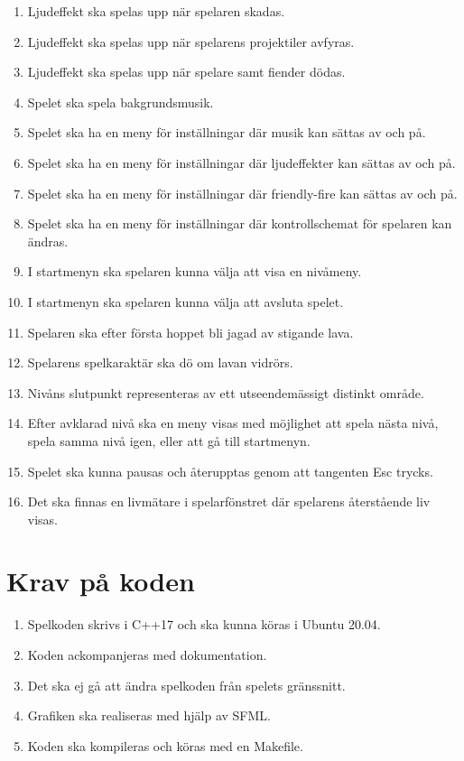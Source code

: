 \documentclass{TDP005mall}
\begin{document}
\begin{enumerate}
\item Ljudeffekt ska spelas upp när spelaren skadas.
\item Ljudeffekt ska spelas upp när spelarens projektiler avfyras.
\item Ljudeffekt ska spelas upp när spelare samt fiender dödas.
\item Spelet ska spela bakgrundsmusik.
\item Spelet ska ha en meny för inställningar där musik kan sättas av och på.
\item Spelet ska ha en meny för inställningar där ljudeffekter kan sättas av och på.
\item Spelet ska ha en meny för inställningar där friendly-fire kan sättas av och på.
\item Spelet ska ha en meny för inställningar där kontrollschemat för spelaren kan ändras.
\item I startmenyn ska spelaren kunna välja att visa en nivåmeny.
\item I startmenyn ska spelaren kunna välja att avsluta spelet.
\item Spelaren ska efter första hoppet bli jagad av stigande lava.
\item Spelarens spelkaraktär ska dö om lavan vidrörs.
\item Nivåns slutpunkt representeras av ett utseendemässigt distinkt område.
\item Efter avklarad nivå ska en meny visas med möjlighet att spela nästa nivå, spela samma nivå igen, eller att gå till startmenyn.
\item Spelet ska kunna pausas och återupptas genom att tangenten Esc trycks.
\item Det ska finnas en livmätare i spelarfönstret där spelarens återstående liv visas.
\end{enumerate}



\section{Krav på koden} %
\begin{enumerate}
\item    Spelkoden skrivs i C++17 och ska kunna köras i Ubuntu 20.04.
\item    Koden ackompanjeras med dokumentation.
\item    Det ska ej gå att ändra spelkoden från spelets gränssnitt.
\item    Grafiken ska realiseras med hjälp av SFML.
\item    Koden ska kompileras och köras med en Makefile.
\end{enumerate}
\end{document}
